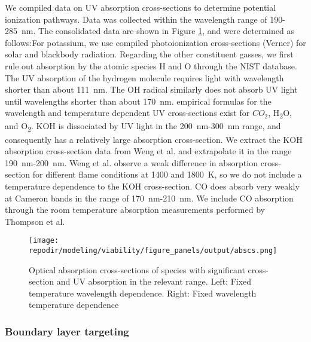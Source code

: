 We compiled data on UV absorption cross-sections to determine potential ionization pathways. Data was collected within the wavelength range of 190-\SI{285}{\nano\meter}. The consolidated data are shown in Figure \ref{fig:SI_UV_abscs}, and were determined as follows:For potassium, we use compiled photoionization cross-sections (Verner) for solar and blackbody radiation.\cite{huebnerPhotoionizationPhotodissociationRates2015} Regarding the other constituent gasses, we first rule out absorption by the atomic species H and O through the NIST database.\cite{sansonettiHandbookBasicAtomic2005} The UV absorption of the hydrogen molecule requires light with wavelength shorter than about \SI{111}{\nano\meter}.\cite{franceFARULTRAVIOLETMOLECULARHYDROGEN} The OH radical similarly does not absorb UV light until wavelengths shorter than about \SI{170}{\nano\meter}.\cite{chipmanAbsorptionSpectrumOH2008} empirical formulas for the wavelength and temperature dependent UV cross-sections exist for $CO_2$\cite{oehlschlaegerUltravioletAbsorptionCrosssections2004}, H\textsubscript{2}O,\cite{zuevUVABSORPTIONCROSS} and O\textsubscript{2}.\cite{zuevUVABSORPTIONCROSS} KOH is dissociated by UV light in the \SI{200}{\nano\meter}-\SI{300}{\nano\meter} range, and consequently has a relatively large absorption cross-section. We extract the KOH absorption cross-section data from Weng et al. and extrapolate it in the range \SI{190}{\nano\meter}-\SI{200}{\nano\meter}.\cite{wengUltravioletAbsorptionCross2019} Weng et al. observe a weak difference in absorption cross-section for different flame conditions at 1400 and \SI{1800}{\kelvin}, so we do not include a temperature dependence to the KOH cross-section. CO does absorb very weakly at Cameron bands in the range of \SI{170}{\nano\meter}-\SI{210}{\nano\meter}. We include CO absorption through the room temperature absorption measurements performed by Thompson et al.\cite{thompsonUltravioletAbsorptionCoefficients1963} 


\begin{figure}[h]
    \centering
    \texttt{[image: \\repodir/modeling/viability/figure\_panels/output/abscs.png]} 
    \caption{Optical absorption cross-sections of species with significant cross-section and UV absorption in the relevant range. Left: Fixed temperature wavelength dependence. Right: Fixed wavelength temperature dependence}
    \label{fig:SI_UV_abscs}
\end{figure}


\subsubsection{Boundary layer targeting}


